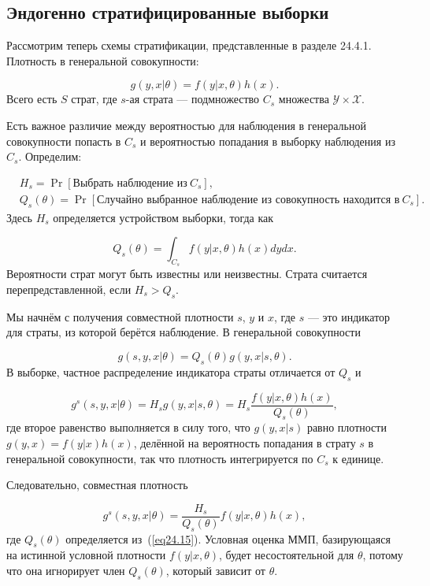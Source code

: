 \subsection{Эндогенно стратифицированные выборки}

Рассмотрим теперь схемы стратификации, представленные в разделе 24.4.1. Плотность в генеральной совокупности:

$$
g(y, x| \theta) = f(y|x, \theta) h(x). 
$$
Всего есть $S$ страт, где $s$-ая страта --- подмножество $C_s$ множества $\mathcal Y \times \mathcal X$. 

Есть важное различие между вероятностью для наблюдения в генеральной совокупности попасть в $C_s$ и вероятностью попадания в выборку наблюдения из $C_s$. Определим:

\begin{align}
 &H_s = \Pr[\text{Выбрать наблюдение из} \ C_s], \nonumber \\
 &Q_s(\theta) = \Pr[ \text{Случайно выбранное наблюдение из совокупность находится в} \ C_s].
\label{eq24.14}
\end{align}
Здесь $H_s$ определяется устройством выборки, тогда как

\begin{equation}
\label{eq24.15}
Q_s(\theta) = \int_{C_s} f(y|x, \theta) h(x) dy dx. 
\end{equation}
Вероятности страт могут быть известны или неизвестны. Страта считается перепредставленной, если $H_s > Q_s$. 

Мы начнём с получения совместной плотности $s$, $y$ и $x$, где $s$ --- это индикатор для страты, из которой берётся наблюдение. В генеральной совокупности

$$
g(s,y,x|\theta) = Q_s(\theta) g(y,x|s, \theta). 
$$
В выборке, частное распределение индикатора страты отличается от $Q_s$ и

$$
g^s(s,y,x|\theta) = H_s g(y,x|s,\theta) = H_s \frac{f(y|x,\theta)h(x)}{Q_s(\theta)},
$$
где второе равенство выполняется в силу того, что $g(y,x|s)$ равно плотности $g(y,x) = f(y|x) h(x)$, делённой на вероятность попадания в страту $s$ в генеральной совокупности, так что плотность интегрируется по $C_s$ к единице. 

Следовательно, совместная плотность

\begin{equation}
\label{eq24.16}
g^s(s,y,x|\theta) = \frac{H_s}{Q_s(\theta)} f(y|x, \theta) h(x),
\end{equation}
где $Q_s(\theta)$ определяется из~(\ref{eq24.15}). Условная оценка ММП, базирующаяся на истинной условной плотности $f(y|x,\theta)$, будет несостоятельной для $\theta$, потому что она игнорирует член $Q_s(\theta)$, который зависит от $\theta$. 

